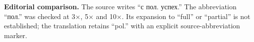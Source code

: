 \par\smallskip\noindent\leavevmode{}\label{GELFAND-P001455:recolouring-success-abbreviation:editorial}{\footnotesize\textbf{Editorial comparison.} The source writes “с пол. успех.” The abbreviation “пол.” was checked at 3×, 5× and 10×. Its expansion to “full” or “partial” is not established; the translation retains “pol.” with an explicit source-abbreviation marker.\par}\smallskip
